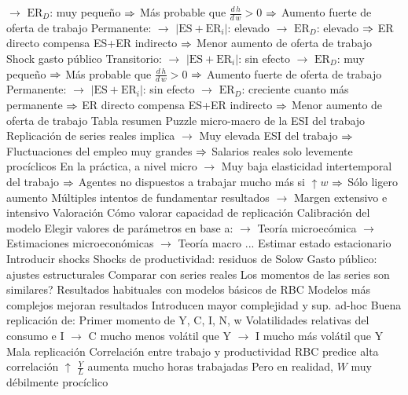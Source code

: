 \documentclass{nuevotema}
\begin{document}
\begin{esquemal}
				\4[] $\to$ $\text{ER}_D$: muy pequeño
				\4[] $\Rightarrow$ Más probable que $\frac{d \, h}{d \, w} > 0$
				\4[] $\Rightarrow$ Aumento fuerte de oferta de trabajo
				\4[] Permanente:
				\4[] $\to$ $\left| \text{ES} + \text{ER}_i\right|$: elevado
				\4[] $\to$ $\text{ER}_D$: elevado
				\4[] $\Rightarrow$ ER directo compensa ES+ER indirecto
				\4[] $\Rightarrow$ Menor aumento de oferta de trabajo
				\4 Shock gasto público
				\4[] Transitorio:
				\4[] $\to$ $\left| \text{ES} + \text{ER}_i\right|$: sin efecto
				\4[] $\to$ $\text{ER}_D$: muy pequeño
				\4[] $\Rightarrow$ Más probable que $\frac{d \, h}{d \, w} > 0$
				\4[] $\Rightarrow$ Aumento fuerte de oferta de trabajo
				\4[] Permanente:
				\4[] $\to$ $\left| \text{ES} + \text{ER}_i\right|$: sin efecto
				\4[] $\to$ $\text{ER}_D$: creciente cuanto más permanente
				\4[] $\Rightarrow$ ER directo compensa ES+ER indirecto
				\4[] $\Rightarrow$ Menor aumento de oferta de trabajo
				\4 Tabla resumen
				\4[] 
				\4 Puzzle micro-macro de la ESI del trabajo
				\4[] Replicación de series reales implica
				\4[] $\to$ Muy elevada ESI del trabajo
				\4[] $\Rightarrow$ Fluctuaciones del empleo muy grandes
				\4[] $\Rightarrow$ Salarios reales solo levemente procíclicos
				\4[] En la práctica, a nivel micro
				\4[] $\to$ Muy baja elasticidad intertemporal del trabajo
				\4[] $\Rightarrow$ Agentes no dispuestos a trabajar mucho más si $\uparrow w$
				\4[] $\Rightarrow$ Sólo ligero aumento
				\4[] Múltiples intentos de fundamentar resultados
				\4[] $\to$ Margen extensivo e intensivo
			\3 Valoración
				\4 Cómo valorar capacidad de replicación
				\4[1] Calibración del modelo
				\4[] Elegir valores de parámetros en base a:
				\4[] $\to$ Teoría microecómica
				\4[] $\to$ Estimaciones microeconómicas
				\4[] $\to$ Teoría macro
				\4[] ...
				\4[2] Estimar estado estacionario
				\4[3] Introducir shocks
				\4[] Shocks de productividad: residuos de Solow
				\4[] Gasto público: ajustes estructurales
				\4[4] Comparar con series reales
				\4[] Los momentos de las series son similares?
				\4 Resultados habituales con modelos básicos de RBC
				\4[] Modelos más complejos mejoran resultados
				\4[] Introducen mayor complejidad y sup. ad-hoc
				\4 Buena replicación de:
				\4[] Primer momento de Y, C, I, N, w
				\4[] Volatilidades relativas del consumo e I
				\4[] $\to$ C mucho menos volátil que Y
				\4[] $\to$ I mucho más volátil que Y
				\4 Mala replicación
				\4[] Correlación entre trabajo y productividad
				\4[] RBC predice alta correlación
				\4[] $\uparrow$ $\frac{Y}{L}$ aumenta mucho horas trabajadas
				\4[] Pero en realidad, $W$ muy débilmente procíclico

\end{esquemal}
\end{document}
